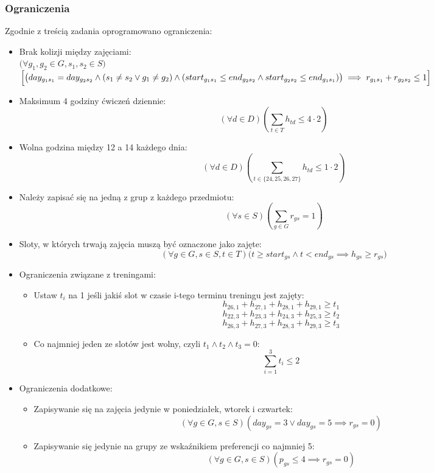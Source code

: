 \documentclass{article}
\begin{document}
\subsubsection{Ograniczenia}
Zgodnie z treścią zadania oprogramowano ograniczenia:
\begin{itemize}
	\item Brak kolizji między zajęciami:\\ 
$\bigl(\forall g_1,g_2 \in G, s_1,s_2 \in S \bigr)$\\
$\Bigl[\bigl(day_{g_1 s_1} = day_{g_2 s_2} \land (s_1 \neq s_2 \lor g_1 \neq g_2) \land (start_{g_1 s_1} \leq end_{g_2 s_2} \land start_{g_2 s_2} \leq end_{g_1 s_1})\bigr) \implies r_{g_1 s_1} + r_{g_2 s_2} \leq 1 \Bigr]$
	\item Maksimum 4 godziny ćwiczeń dziennie: \[(\forall d \in D) \left(\sum_{t \in T}{h_{td} \leq 4 \cdot 2}\right)\]
	\item Wolna godzina między 12 a 14 każdego dnia: \[(\forall d \in D) \left(\sum_{t \in \{24,25,26,27\}}{h_{td}} \leq 1 \cdot 2\right)\]
	\item Należy zapisać się na jedną z grup z każdego przedmiotu: \[(\forall s \in S)\left(\sum_{g \in G}{r_{gs}} = 1 \right)\]
	\item Sloty, w których trwają zajęcia muszą być oznaczone jako zajęte: \[(\forall g \in G, s \in S, t \in T)\bigl(t \geq start_{gs} \land t < end_{gs} \implies h_{gs} \geq r_{gs}\bigr)\]
	\item Ograniczenia związane z treningami:
	\begin{itemize}
		\item Ustaw $t_i$ na 1 jeśli jakiś slot w czasie i-tego terminu treningu jest zajęty: \[h_{26,1} + h_{27,1} + h_{28,1} + h_{29,1} \geq t_1\] \[h_{22,3} + h_{23,3} + h_{24,3} + h_{25,3} \geq t_2\] \[h_{26,3} + h_{27,3} + h_{28,3} + h_{29,3} \geq t_3\]
		\item Co najmniej jeden ze slotów jest wolny, czyli $t_1 \land t_2 \land t_3 = 0$:	\[\sum_{i=1}^3{t_i} \leq 2\]
	\end{itemize}
	\item Ograniczenia dodatkowe:
	\begin{itemize}
		\item Zapisywanie się na zajęcia jedynie w poniedziałek, wtorek i czwartek: \[(\forall g \in G, s \in S)(day_{gs} = 3 \lor day_{gs} = 5 \implies r_{gs} = 0)\]
		\item Zapisywanie się jedynie na grupy ze wskaźnikiem preferencji co najmniej 5: \[(\forall g \in G, s \in S)(p_{gs} \leq 4 \implies r_{gs} = 0)\]
	\end{itemize}
\end{itemize}
\end{document}
